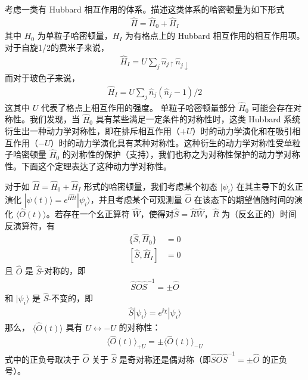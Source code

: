 考虑一类有 Hubbard 相互作用的体系。描述这类体系的哈密顿量为如下形式
\begin{align}
\hat{H} = \hat{H}_0 + \hat{H}_I
\end{align}
其中 $H_0$ 为单粒子哈密顿量，$H_I$ 为有格点上的 Hubbard 相互作用的相互作用项。对于自旋1/2的费米子来说，
\begin{align}
\hat{H}_I=U\sum_j\hat{n}_{j\uparrow}\hat{n}_{j\downarrow}
\end{align}
而对于玻色子来说，
\begin{align}
\hat{H}_I=U\sum_{j}\hat{n}_j(\hat{n}_j-1)/2
\end{align}
这其中 $U$ 代表了格点上相互作用的强度。
单粒子哈密顿量部分 $\hat{H}_0$ 可能会存在对称性。我们发现，当 $\hat{H}_0$ 具有某些满足一定条件的对称性时，这类 Hubbard 系统衍生出一种动力学对称性，即在排斥相互作用（$+U$）时的动力学演化和在吸引相互作用（$-U$）时的动力学演化具有某种对称性。这种衍生的动力学对称性受单粒子哈密顿量 $\hat{H}_0$ 的对称性的保护（支持），我们也称之为对称性保护的动力学对称性\cite{dynsymm}。下面这个定理表达了这种动力学对称性。
\begin{theorem}\label{thm:dynsymm}
对于如 $\hat{H} = \hat{H}_0 + \hat{H}_I$ 形式的哈密顿量，我们考虑某个初态 $|\psi_i\rangle$ 在其主导下的幺正演化 $|\psi(t)\rangle = e^{\ii\hat{H}t}|\psi_i\rangle$，并且考虑某个可观测量 $\hat{O}$ 在该态下的期望值随时间的演化 $\langle\hat{O}(t)\rangle$。若存在一个幺正算符 $\hat{W}$，使得对$\hat{S}=\hat{R}\hat{W}$，$\hat{R}$ 为（反幺正的）时间反演算符，有
\begin{align}
\{\hat{S}, \hat{H}_0\} &= 0\\
[\hat{S}, \hat{H}_I] &= 0
\end{align}
且 $\hat{O}$ 是 $\hat{S}$-对称的，即
\begin{align}
\hat{S}\hat{O}\hat{S}^{-1} = \pm \hat{O}
\end{align}
和 $|\psi_i\rangle$ 是 $\hat{S}$-不变的，即
\begin{align}
\hat{S}|\psi_i\rangle = e^{\ii\chi}|\psi_i\rangle
\end{align}
那么， $\langle\hat{O}(t)\rangle$ 具有 $U\leftrightarrow-U$ 的对称性：
\begin{align}
\langle\hat{O}(t)\rangle_{+U} = \pm\langle\hat{O}(t)\rangle_{-U}
\end{align}
式中的正负号取决于 $\hat{O}$ 关于 $\hat{S}$ 是奇对称还是偶对称（即$\hat{S}\hat{O}\hat{S}^{-1} = \pm \hat{O}$ 的正负号）。
\end{theorem}

